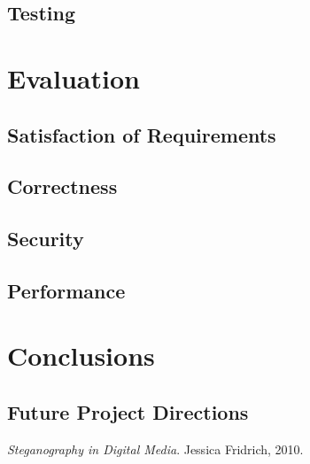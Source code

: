 \documentclass[paper=a4, fontsize=11pt,twoside]{scrartcl}    %
\numberwithin{table}{section}
\numberwithin{figure}{section}
\numberwithin{algorithm}{section}
\begin{document}
\subsection{Testing}

\section{Evaluation}
\subsection{Satisfaction of Requirements}
\subsection{Correctness}
\subsection{Security}
\subsection{Performance}

\section{Conclusions}
\subsection{Future Project Directions}


\begin{thebibliography}{1}

  \emph{Steganography in Digital Media}.
  Jessica Fridrich, 2010.

\end{thebibliography}
\end{document}
